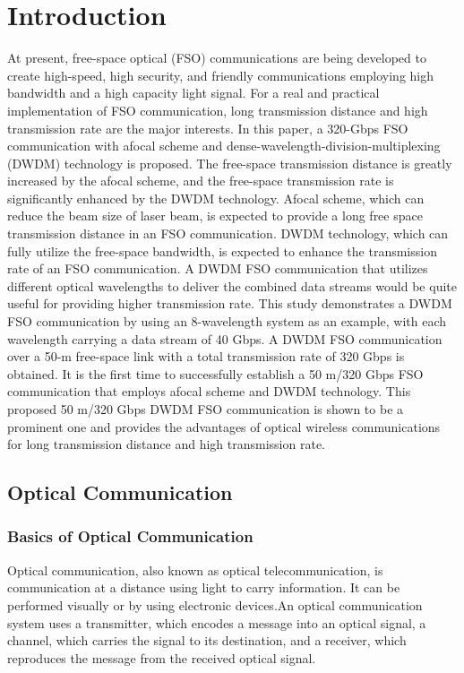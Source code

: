 \documentclass[hidelinks, 12pt]{report}
\begin{document}
\chapter{Introduction}
\justify
At present, free-space optical (FSO) communications are being developed to create high-speed,
high security, and friendly communications employing high bandwidth and a high capacity light
signal. For a real and
practical implementation of FSO communication, long transmission distance and high transmission
rate are the major interests. In this paper, a 320-Gbps FSO communication
with afocal scheme and dense-wavelength-division-multiplexing (DWDM) technology is proposed. The free-space transmission distance is greatly increased by the afocal scheme, and
the free-space transmission rate is significantly enhanced by the DWDM technology. Afocal
scheme, which can reduce the beam size of laser beam, is expected to provide a long free space
transmission distance in an FSO communication. DWDM technology, which can fully
utilize the free-space bandwidth, is expected to enhance the transmission rate of an FSO communication. A DWDM FSO communication that utilizes different optical wavelengths to deliver
the combined data streams would be quite useful for providing higher transmission rate.
This study demonstrates a DWDM FSO communication by using an 8-wavelength system as an
example, with each wavelength carrying a data stream of 40 Gbps. A DWDM FSO communication
over a 50-m free-space link with a total transmission rate of 320 Gbps is obtained. It is the first time to successfully establish a
50 m/320 Gbps FSO communication that employs afocal scheme and DWDM technology. 
This proposed 50 m/320 Gbps DWDM FSO communication is shown to be a prominent
one and provides the advantages of optical wireless communications for long transmission
distance and high transmission rate.
\section{Optical Communication}
\subsection{Basics of Optical Communication}
\justify
Optical communication, also known as optical telecommunication, is communication at a distance using light to carry information. It can be performed visually or by using electronic devices.An optical communication system uses a transmitter, which encodes a message into an optical signal, a channel, which carries the signal to its destination, and a receiver, which reproduces the message from the received optical signal.  
\end{document}

